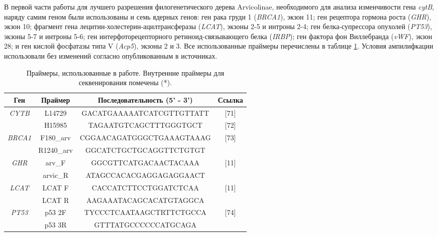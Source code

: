 В первой части работы для лучшего разрешения филогенетического дерева Arvicolinae, необходимого для анализа изменчивости гена \textit{cytB}, наряду самим геном были использованы и семь ядерных генов: ген рака груди 1 (\textit{BRCA1}), экзон 11; ген рецептора гормона роста (\textit{GHR}), экзон 10; фрагмент гена лецитин-холестерин-ацилтрансферазы (\textit{LCAT}), экзоны 2-5 и интроны 2-4; ген белка-супрессора опухолей (\textit{PT53}), экзоны 5-7 и интроны 5-6; ген интерфоторецепторного ретиноид-связывающего белка (\textit{IRBP}); ген фактора фон Виллебранда (\textit{vWF}), экзон 28; и ген кислой фосфатазы типа V (\textit{Acp5}), экзоны 2 и 3. Все использованные праймеры перечислены в таблице \ref{primers}. Условия ампилифкации использовали без изменений согласно опубликованным в источниках. 

\begin{table}[h!]
\caption{Праймеры, использованные в работе. Внутренние праймеры для секвенирования помечены (*).}\label{primers}

\begin{center}

\begin{tabular}{|c|c|c|c|}
	\hline 
\textbf{Ген}	& \textbf{Праймер} & \textbf{Последовательность (5' - 3')} & \textbf{Ссылка} \\ 
	\hline 
\multirow{2}{*}{\textit{CYTB}}	& L14729  & GACATGAAAAATCATCGTTGTTATT & [71] \\ 
	\cline{2-4} 
		& H15985 & TAGAATGTCAGCTTTGGGTGCT & [72] \\ 
	\hline 

\multirow{2}{*}{\textit{BRCA1}}	& F180\_arv  & CGGAACAGATGGGCTGAAAGTAAAG & \multirow{2}{*}{[73]}\\ 
\cline{2-3} 
& R1240\_arv & GGCATCTGCTGCAGGTTCTGTGT & \\ 
	\hline 

\multirow{2}{*}{\textit{GHR}}	& arv\_F  & GGCGTTCATGACAACTACAAA & \multirow{2}{*}{[11]}\\ 
\cline{2-3} 
& arvic\_R & ATAGCCACACGAGGAGAGGAACT & \\ 
\hline 

\multirow{2}{*}{\textit{LCAT}}	& LCAT F  & CACCATCTTCCTGGATCTCAA & \multirow{2}{*}{[11]}\\ 
\cline{2-3} 
& LCAT R & AAGAAATACAGCACATGTAGGCA & \\ 
\hline

\multirow{2}{*}{\textit{PT53}}	& p53 2F  & TYCCCTCAATAAGCTRTTCTGCCA & \multirow{2}{*}{[74]}\\ 
\cline{2-3} 
& p53 3R & GTTTATGCCCCCCATGCAGA & \\ 
\hline


\end{tabular}
\end{center}
\end{table}
